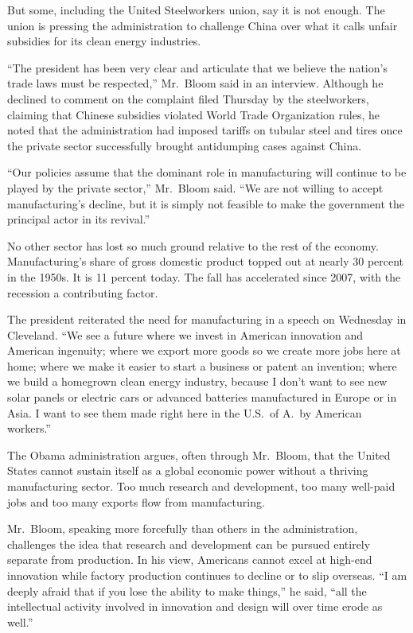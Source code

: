﻿\documentclass[12pt]{article}
\begin{document}
But some, including the United Steelworkers union, say it is not enough. The union is pressing the
administration to challenge China over what it calls unfair subsidies for its clean energy
industries.

``The president has been very clear and articulate that we believe the nation's trade laws must be
respected,'' Mr.~Bloom said in an interview. Although he declined to comment on the complaint filed
Thursday by the steelworkers, claiming that Chinese subsidies violated World Trade Organization
rules, he noted that the administration had imposed tariffs on tubular steel and tires once the
private sector successfully brought antidumping cases against China.

``Our policies assume that the dominant role in manufacturing will continue to be played by the
private sector,'' Mr.~Bloom said. ``We are not willing to accept manufacturing's decline, but it is
simply not feasible to make the government the principal actor in its revival.''

No other sector has lost so much ground relative to the rest of the economy. Manufacturing's share
of gross domestic product topped out at nearly 30 percent in the 1950s. It is 11 percent today. The
fall has accelerated since 2007, with the recession a contributing factor.

The president reiterated the need for manufacturing in a speech on Wednesday in Cleveland. ``We see
a future where we invest in American innovation and American ingenuity; where we export more goods
so we create more jobs here at home; where we make it easier to start a business or patent an
invention; where we build a homegrown clean energy industry, because I don't want to see new solar
panels or electric cars or advanced batteries manufactured in Europe or in Asia. I want to see them
made right here in the U.S.~of A.~by American workers.''

The Obama administration argues, often through Mr.~Bloom, that the United States cannot sustain
itself as a global economic power without a thriving manufacturing sector. Too much research and
development, too many well-paid jobs and too many exports flow from manufacturing.

Mr.~Bloom, speaking more forcefully than others in the administration, challenges the idea that
research and development can be pursued entirely separate from production. In his view, Americans
cannot excel at high-end innovation while factory production continues to decline or to slip
overseas. ``I am deeply afraid that if you lose the ability to make things,'' he said, ``all the
intellectual activity involved in innovation and design will over time erode as well.''
\end{document}
